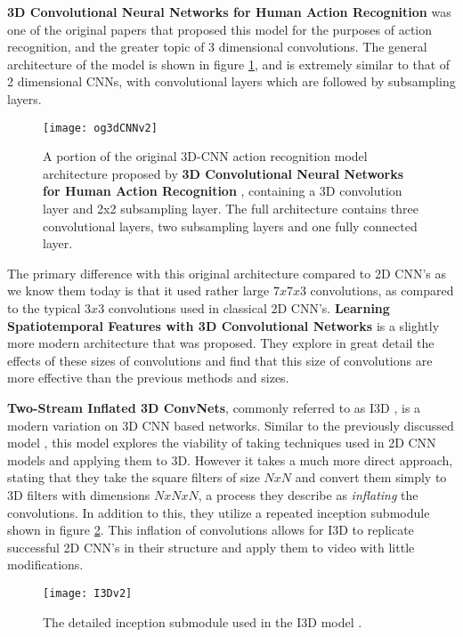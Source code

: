 \textbf{3D Convolutional Neural Networks for Human Action Recognition} \cite{3DCNN-ActionRecognition} was one of the original papers that proposed this model for the purposes of action recognition, and the greater topic of 3 dimensional convolutions. The general architecture of the model is shown in figure \ref{fig:original3dcnn}, and is extremely similar to that of 2 dimensional CNNs, with convolutional layers which are followed by subsampling layers.

\begin{figure}[ht]
	\texttt{[image: og3dCNNv2]}
	\centering
	\caption{A portion of the original 3D-CNN action recognition model architecture proposed by \textbf{3D Convolutional Neural Networks for Human Action Recognition} \cite{3DCNN-ActionRecognition}, containing a 3D convolution layer and 2x2 subsampling layer. The full architecture contains three convolutional layers, two subsampling layers and one fully connected layer.}
	\label{fig:original3dcnn}
\end{figure}

The primary difference with this original architecture compared to 2D CNN's as we know them today is that it used rather large $7x7x3$ convolutions, as compared to the typical $3x3$ convolutions used in classical 2D CNN's. \textbf{Learning Spatiotemporal Features with 3D Convolutional Networks} \cite{3x33dcnn} is a slightly more modern architecture that was proposed. They explore in great detail the effects of these sizes of convolutions and find that this size of convolutions are more effective than the previous methods and sizes.

\textbf{Two-Stream Inflated 3D ConvNets}, commonly referred to as I3D \cite{i3d}, is a modern variation on 3D CNN based networks. Similar to the previously discussed model \cite{3DCNN-ActionRecognition}, this model explores the viability of taking techniques used in 2D CNN models and applying them to 3D. However it takes a much more direct approach, stating that they take the square filters of size $NxN$ and convert them simply to 3D filters with dimensions $NxNxN$, a process they describe as \textit{inflating} the convolutions. In addition to this, they utilize a repeated inception submodule shown in figure \ref{fig:I3D}. This inflation of convolutions allows for I3D to replicate successful 2D CNN's in their structure and apply them to video with little modifications.

\begin{figure}[ht]
	\texttt{[image: I3Dv2]}
	\centering
	\caption{The detailed inception submodule used in the I3D model \cite{i3d}.}
	\label{fig:I3D}
\end{figure}

